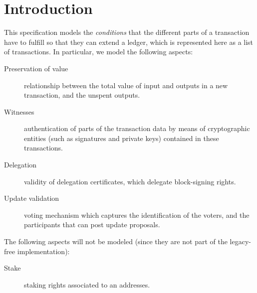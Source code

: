 \section{Introduction}
\label{sec:introduction}

This specification models the \textit{conditions} that the different parts of a
transaction have to fulfill so that they can extend a ledger, which is
represented here as a list of transactions. In particular, we model the
following aspects:

\begin{description}
\item[Preservation of value] relationship between the total value of input and
  outputs in a new transaction, and the unspent outputs.
\item[Witnesses] authentication of parts of the transaction data by means of
  cryptographic entities (such as signatures and private keys) contained in
  these transactions.
\item[Delegation] validity of delegation certificates, which delegate
  block-signing rights.
\item[Update validation] voting mechanism which captures the identification of
  the voters, and the participants that can post update proposals.
\end{description}

The following aspects will not be modeled (since they are not part of the legacy-free
implementation):
\begin{description}
\item[Stake] staking rights associated to an addresses.
\end{description}
